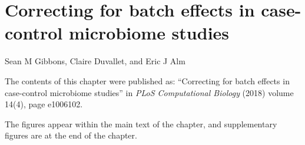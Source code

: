 
\graphicspath{{perc-norm/figures/}}

\chapter{Correcting for batch effects in case-control microbiome studies}\label{chap:perc-norm}

\noindent
Sean M Gibbons, Claire Duvallet, and Eric J Alm

\bigskip
\bigskip
\noindent
The contents of this chapter were published as: ``Correcting for batch effects in case-control microbiome studies'' in \textit{PLoS Computational Biology} (2018) volume 14(4), page e1006102.

\bigskip
\bigskip
\noindent
The figures appear within the main text of the chapter, and supplementary figures are at the end of the chapter.

\clearpage


